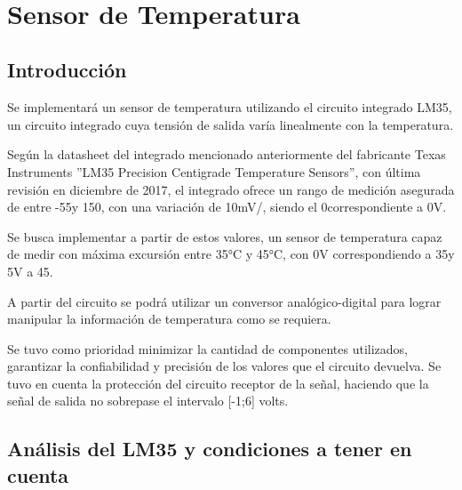 \documentclass[../../main.tex]{subfiles}
\begin{document}
\
\section{Sensor de Temperatura}

\subsection{Introducción}

Se implementará un sensor de temperatura utilizando el circuito integrado LM35, un circuito integrado cuya tensión de salida varía linealmente con la temperatura. \par
Según la datasheet del integrado mencionado anteriormente del fabricante Texas Instruments ''LM35 Precision Centigrade Temperature Sensors'', con última revisión en diciembre de 2017, el integrado ofrece un rango de medición asegurada de entre -55\celsius y 150\celsius, con una variación de 10mV/\celsius, siendo el 0\celsius correspondiente a 0V. \par
Se busca implementar a partir de estos valores, un sensor de temperatura capaz de medir con máxima excursión entre 35°C y 45°C, con 0V correspondiendo a 35\celsius y 5V a 45\celsius.\par
A partir del circuito se podrá utilizar un conversor analógico-digital para lograr manipular la información de temperatura como se requiera. \par
Se tuvo como prioridad minimizar la cantidad de componentes utilizados, garantizar la confiabilidad y precisión de los valores que el circuito devuelva. Se tuvo en cuenta la protección del circuito receptor de la señal, haciendo que la señal de salida no sobrepase el intervalo [-1;6] volts.

\subsection{Análisis del LM35 y condiciones a tener en cuenta}
\label{condiciones} 	%
\end{document}
